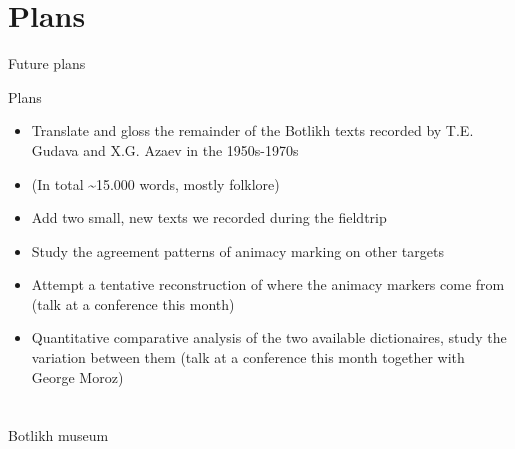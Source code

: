 \section{Plans}
\begin{frame}
\begin{center}
    \begin{huge} \color{darkscarlet}
    Future plans
    \end{huge}
\end{center}
\end{frame}

\begin{frame}{Plans}

\begin{itemize}
    \item Translate and gloss the remainder of the Botlikh texts recorded by T.E. Gudava and X.G. Azaev in the 1950s-1970s
    \item (In total \textasciitilde{}15.000 words, mostly folklore)
    \item Add two small, new texts we recorded during the fieldtrip
    \pause
    \item Study the agreement patterns of animacy marking on other targets
    \item Attempt a tentative reconstruction of where the animacy markers come from (talk at a conference this month)
    \item Quantitative comparative analysis of the two available dictionaires, study the variation between them (talk at a conference this month together with George Moroz)
\end{itemize}
\end{frame}

\section{}

\begin{frame}{Botlikh museum}
\begin{figure}[h]
\centering
{}
\end{figure}
\end{frame}

